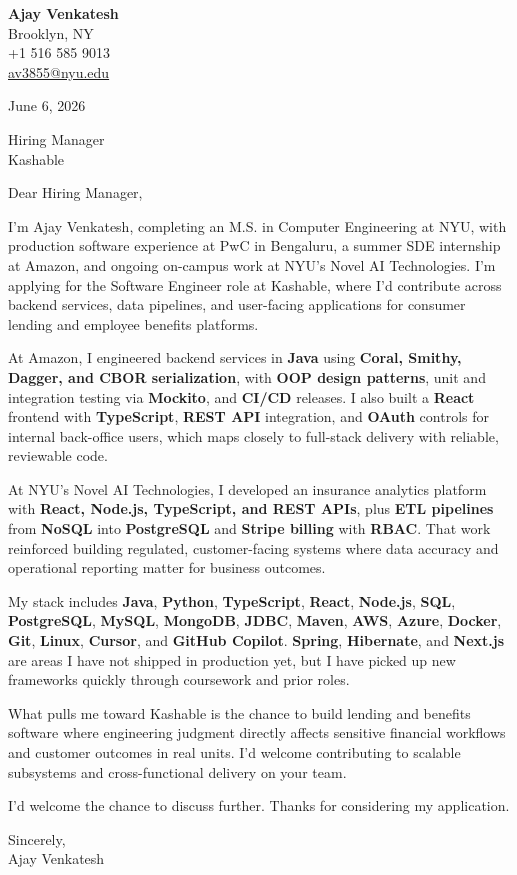 \documentclass[letterpaper,11pt]{article}
\begin{document}
\begin{flushleft}
\textbf{\large Ajay Venkatesh} \\
Brooklyn, NY \\
+1 516 585 9013 \\
\href{mailto:av3855@nyu.edu}{av3855@nyu.edu}
\end{flushleft}
\vspace{10pt}
June 6, 2026
\vspace{6pt}

Hiring Manager \\
Kashable

\vspace{10pt}

Dear Hiring Manager,

I'm Ajay Venkatesh, completing an M.S. in Computer Engineering at NYU, with production software experience at PwC in Bengaluru, a summer SDE internship at Amazon, and ongoing on-campus work at NYU's Novel AI Technologies. I'm applying for the Software Engineer role at Kashable, where I'd contribute across backend services, data pipelines, and user-facing applications for consumer lending and employee benefits platforms.

At Amazon, I engineered backend services in \textbf{Java} using \textbf{Coral, Smithy, Dagger, and CBOR serialization}, with \textbf{OOP design patterns}, unit and integration testing via \textbf{Mockito}, and \textbf{CI/CD} releases. I also built a \textbf{React} frontend with \textbf{TypeScript}, \textbf{REST API} integration, and \textbf{OAuth} controls for internal back-office users, which maps closely to full-stack delivery with reliable, reviewable code.

At NYU's Novel AI Technologies, I developed an insurance analytics platform with \textbf{React, Node.js, TypeScript, and REST APIs}, plus \textbf{ETL pipelines} from \textbf{NoSQL} into \textbf{PostgreSQL} and \textbf{Stripe billing} with \textbf{RBAC}. That work reinforced building regulated, customer-facing systems where data accuracy and operational reporting matter for business outcomes.

My stack includes \textbf{Java}, \textbf{Python}, \textbf{TypeScript}, \textbf{React}, \textbf{Node.js}, \textbf{SQL}, \textbf{PostgreSQL}, \textbf{MySQL}, \textbf{MongoDB}, \textbf{JDBC}, \textbf{Maven}, \textbf{AWS}, \textbf{Azure}, \textbf{Docker}, \textbf{Git}, \textbf{Linux}, \textbf{Cursor}, and \textbf{GitHub Copilot}. \textbf{Spring}, \textbf{Hibernate}, and \textbf{Next.js} are areas I have not shipped in production yet, but I have picked up new frameworks quickly through coursework and prior roles.

What pulls me toward Kashable is the chance to build lending and benefits software where engineering judgment directly affects sensitive financial workflows and customer outcomes in real units. I'd welcome contributing to scalable subsystems and cross-functional delivery on your team.

I'd welcome the chance to discuss further. Thanks for considering my application.

\vspace{12pt}
Sincerely, \\
Ajay Venkatesh
\end{document}
